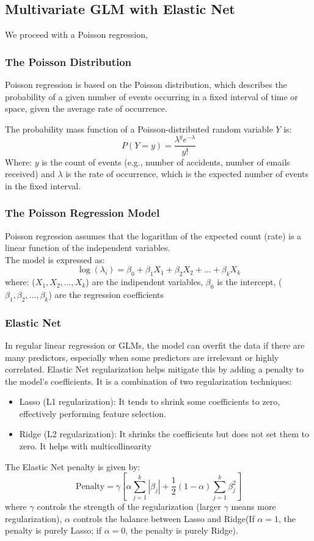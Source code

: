 \documentclass[a4paper, 8pt]{article}
\begin{document}
\begin{multicols}{2}
\subsection{Multivariate GLM with Elastic Net}
We proceed with a Poisson regression, 
\subsubsection{The Poisson Distribution}
Poisson regression is based on the Poisson distribution, which describes the probability of a given number of events occurring in a fixed interval of time or space, given the average rate of occurrence.

The probability mass function of a Poisson-distributed random variable $Y$ is:
\begin{equation}
P(Y=y)= \frac{\lambda^ye^{-\lambda}}{y!}
\end{equation}
Where: $y$ is the count of events (e.g., number of accidents, number of emails received) and $\lambda$ is the rate of occurrence, which is the expected number of events in the fixed interval.
\subsubsection{The Poisson Regression Model}
Poisson regression assumes that the logarithm of the expected count (rate) is a linear function of the independent variables.\\
The model is expressed as:
\begin{equation}
\log(\lambda_i)=\beta_0+\beta_1X_1+\beta_2X_2+\dots+\beta_kX_k
\end{equation}
where: ($X_1, X_2,\dots,X_k$) are the indipendent variables, $\beta_0$ is the intercept, ($\beta_1,\beta_2, \dots, \beta_k$) are the regression coefficients
\subsubsection{Elastic Net}
In regular linear regression or GLMs, the model can overfit the data if there are many predictors, especially when some predictors are irrelevant or highly correlated. Elastic Net regularization helps mitigate this by adding a penalty to the model's coefficients. It is a combination of two regularization techniques: 
\begin{itemize}
\item Lasso (L1 regularization): It tends to shrink some coefficients to zero, effectively performing feature selection.
\item Ridge (L2 regularization): It shrinks the coefficients but does not set them to zero. It helps with multicollinearity
\end{itemize}
The Elastic Net penalty is given by:
\begin{equation}
\text{Penalty}= \gamma \left[\alpha \sum_{j=1}^k|\beta_j| + \frac{1}{2}(1-\alpha)\sum_{j=1}^k\beta_{j}^{2} \right]
\end{equation} 
where $\gamma$ controls the strength of the regularization (larger $\gamma$ means more regularization), $\alpha$ controls the balance between Lasso and Ridge(If $\alpha=1$, the penalty is purely Lasso; if $\alpha=0$, the penalty is purely Ridge).

\end{multicols}
\end{document}
